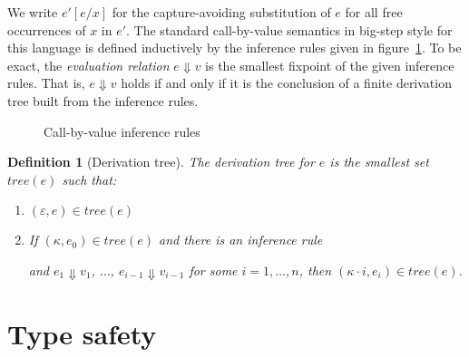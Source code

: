\documentclass[12pt,a2paper,draft]{article}
\newcommand{\abstr}[2]{\ensuremath{\lambda{#1}.\,{#2}}}
\newcommand{\app}[2]{\ensuremath{{#1}\,{#2}}}
\newcommand{\rec}[2]{\ensuremath{{\normalfont\textsf{rec}}\,{#1}.\,{#2}}}
\newcommand{\tree}[1]{\mathit{tree}(#1)}
\newtheorem{definition}{Definition}
\begin{document}
We write $e'[e/x]$ for the capture-avoiding substitution of $e$ for all free occurrences
of $x$ in $e'$. The standard call-by-value semantics in big-step style for this language is
defined inductively by the inference rules given in figure~\ref{figure:Call_by_value_inference_rules}.
To be exact, the \emph{evaluation relation} $e \Downarrow v$ is the smallest fixpoint of
the given inference rules. That is, $e \Downarrow v$ holds if and only if it is the conclusion
of a finite derivation tree built from the inference rules.

\begin{figure}[htb]
  \centering
  \caption{Call-by-value inference rules}
  \label{figure:Call_by_value_inference_rules}
\end{figure}

\begin{definition}[Derivation tree] \label{definition:Derivation_tree}
  The \emph{derivation tree} for $e$ is the smallest set $\tree{e}$ such that:
  \begin{enumerate}
  \item $(\varepsilon, e) \in \tree{e}$
  \item If $(\kappa,e_0) \in \tree{e}$ and there is an inference rule
    \begin{mathpar}
    \end{mathpar}
    and $e_1 \Downarrow v_1$, $\ldots$, $e_{i-1} \Downarrow v_{i-1}$ for some $i = 1,\ldots,n$, then
    $(\kappa \cdot i,e_i) \in \tree{e}$.
  \end{enumerate}
\end{definition}


\section{Type safety}
\end{document}
